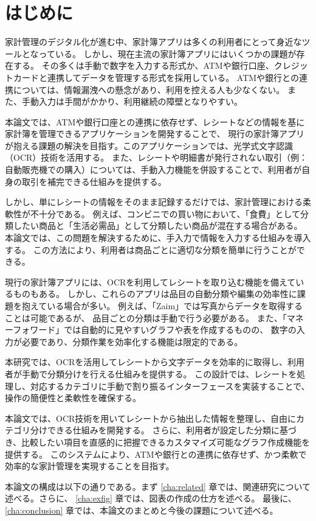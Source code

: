 \documentclass[main]{subfiles}
\begin{document}
\chapter{はじめに}
\label{cha:intro}

家計管理のデジタル化が進む中、家計簿アプリは多くの利用者にとって身近なツールとなっている。
しかし、現在主流の家計簿アプリにはいくつかの課題が存在する。
その多くは手動で数字を入力する形式か、ATMや銀行口座、クレジットカードと連携してデータを管理する形式を採用している。
ATMや銀行との連携については、情報漏洩への懸念があり、利用を控える人も少なくない。
また、手動入力は手間がかかり、利用継続の障壁となりやすい。

本論文では、ATMや銀行口座との連携に依存せず、レシートなどの情報を基に家計簿を管理できるアプリケーションを開発することで、
現行の家計簿アプリが抱える課題の解決を目指す。このアプリケーションでは、光学式文字認識（OCR）技術を活用する。
また、レシートや明細書が発行されない取引（例：自動販売機での購入）については、手動入力機能を併設することで、利用者が自身の取引を補完できる仕組みを提供する。

しかし、単にレシートの情報をそのまま記録するだけでは、家計管理における柔軟性が不十分である。
例えば、コンビニでの買い物において、「食費」として分類したい商品と「生活必需品」として分類したい商品が混在する場合がある。
本論文では、この問題を解決するために、手入力で情報を入力する仕組みを導入する。
この方法により、利用者は商品ごとに適切な分類を簡単に行うことができる。

現行の家計簿アプリには、OCRを利用してレシートを取り込む機能を備えているものもある。
しかし、これらのアプリは品目の自動分類や編集の効率性に課題を抱えている場合が多い。
例えば、「Zaim」では写真からデータを取得することは可能であるが、
品目ごとの分類は手動で行う必要がある。
また、「マネーフォワード」では自動的に見やすいグラフや表を作成するものの、
数字の入力が必要であり、分類作業を効率化する機能は限定的である。

本研究では、OCRを活用してレシートから文字データを効率的に取得し、利用者が手動で分類分けを行える仕組みを提供する。
この設計では、レシートを処理し、対応するカテゴリに手動で割り振るインターフェースを実装することで、操作の簡便性と柔軟性を確保する。

本論文では、OCR技術を用いてレシートから抽出した情報を整理し、自由にカテゴリ分けできる仕組みを開発する。
さらに、利用者が設定した分類に基づき、比較したい項目を直感的に把握できるカスタマイズ可能なグラフ作成機能を提供する。
このシステムにより、ATMや銀行との連携に依存せず、かつ柔軟で効率的な家計管理を実現することを目指す。

本論文の構成は以下の通りである。まず \ref{cha:related} 章では、関連研究について述べる。さらに、
\ref{cha:exfig} 章では、図表の作成の仕方を述べる。
最後に、\ref{cha:conclusion} 章では、本論文のまとめと今後の課題について述べる。
\end{document}

